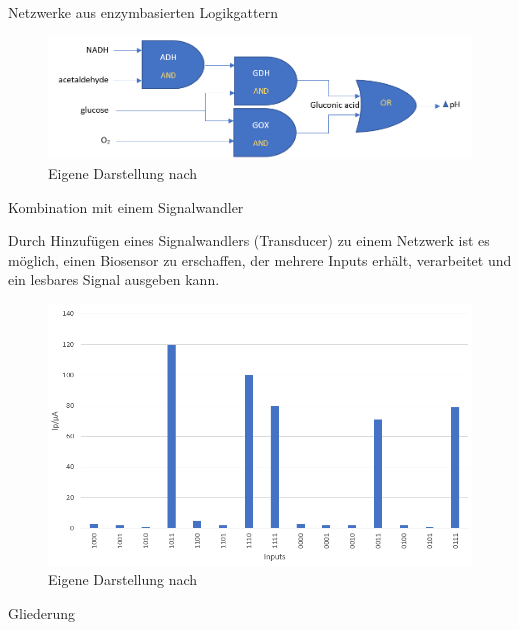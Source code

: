 \documentclass{beamer}
\begin{document}
	\begin{frame}{Netzwerke aus enzymbasierten Logikgattern}
	
	\begin{figure}
		\centering \scriptsize 
		\includegraphics[scale = 0.30]{pics/network2.png} \caption{Eigene Darstellung nach \cite{hallo4}} 
	\end{figure}

	
	\end{frame}


	\begin{frame}{Kombination mit einem Signalwandler}
	
		Durch Hinzuf{\"u}gen eines Signalwandlers (Transducer) zu einem Netzwerk ist es m{\"o}glich, einen Biosensor zu erschaffen, der mehrere Inputs erh{\"a}lt, verarbeitet und ein lesbares Signal ausgeben kann.\\
		
		
        \begin{figure}[H] \centering \includegraphics[scale= 0.30]{pics/pH.png} \caption{Eigene Darstellung nach \cite{hallo4}} \label{img:ph} 
        \end{figure}
        
    \end{frame}
 
 
   	\begin{frame}{Gliederung}
   	\tableofcontents
	\end{frame}
\end{document}

